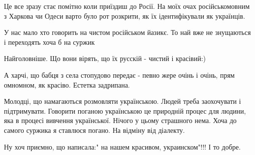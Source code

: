 Це все зразу стає помітно коли приїздиш до Росії. На моїх очах російськомовним
з Харкова чи Одеси варто було рот розкрити, як їх ідентифікували як українців.

 
У нас мало хто говорить на чистом російськом йазикє. То най вже не знущаються і переходять хоча б на суржик

 
Найголовніше. Що вони вірять, що їх русскій - чистий і красівий:)

 
А харчі, що бабця з села стопудово передає - певно жере очінь і очінь, прям омномном, як красіво. Естетка задрипана.

 

Молодці, що намагаються розмовляти українською. Людей треба заохочувати і
підтримувати. Говорити поганою українською це природній процес для людини, яка
в процесі вивчення української. Нічого у цьому страшного нема. Хоча до самого
суржика я ставлюся погано. На відміну від діалекту.

 
Ну хоч приємно, що написала:" на нашем красивом, украинском"!!! І то добре.


